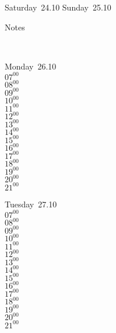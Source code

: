 \documentclass[11pt,a4paper]{book}\usepackage[]{graphicx}\usepackage[]{color}
\begin{document}
{{{{{{{{{{{{{{{{{\begin{tcolorbox}
\end{tcolorbox} 
\begin{tcolorbox}[height=(\textheight-10mm)/6]
Saturday~24.10
\tcblower
Sunday~25.10
\end{tcolorbox} %
\begin{tcolorbox}[height=(\textheight-10mm)/6,sidebyside=false]
Notes
\end{tcolorbox}
\clearpage
\vspace{2 mm}\\
\begin{tcolorbox}
Monday~26.10\\
{ 
  $07^{00}$\\
$08^{00}$\\
$09^{00}$\\
$10^{00}$\\
$11^{00}$\\
$12^{00}$\\
$13^{00}$\\
$14^{00}$\\
$15^{00}$\\
$16^{00}$\\
$17^{00}$\\
$18^{00}$\\
$19^{00}$\\
$20^{00}$\\
$21^{00}$}\\

\end{tcolorbox}
\begin{tcolorbox}
Tuesday~27.10\\
{ 
  $07^{00}$\\
$08^{00}$\\
$09^{00}$\\
$10^{00}$\\
$11^{00}$\\
$12^{00}$\\
$13^{00}$\\
$14^{00}$\\
$15^{00}$\\
$16^{00}$\\
$17^{00}$\\
$18^{00}$\\
$19^{00}$\\
$20^{00}$\\
$21^{00}$}\\


\end{tcolorbox}}}}}}}}}}}}}}}}}}
\end{document}
